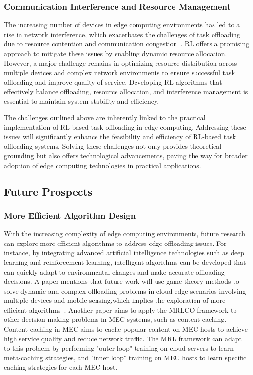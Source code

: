 \documentclass[journal]{IEEEtran}
\begin{document}
\subsubsection{Communication Interference and Resource Management}
The increasing number of devices in edge computing environments has led to a rise in network interference, which exacerbates the challenges of task offloading due to resource contention and communication congestion~\cite{zhou08}. RL offers a promising approach to mitigate these issues by enabling dynamic resource allocation. However, a major challenge remains in optimizing resource distribution across multiple devices and complex network environments to ensure successful task offloading and improve quality of service. Developing RL algorithms that effectively balance offloading, resource allocation, and interference management is essential to maintain system stability and efficiency.

The challenges outlined above are inherently linked to the practical implementation of RL-based task offloading in edge computing. Addressing these issues will significantly enhance the feasibility and efficiency of RL-based task offloading systems. Solving these challenges not only provides theoretical grounding but also offers technological advancements, paving the way for broader adoption of edge computing technologies in practical applications.

\subsection{Future Prospects}

\subsubsection{More Efficient Algorithm Design}
With the increasing complexity of edge computing environments, future research can explore more efficient algorithms to address edge offloading issues. For instance, by integrating advanced artificial intelligence technologies such as deep learning and reinforcement learning, intelligent algorithms can be developed that can quickly adapt to environmental changes and make accurate offloading decisions. A paper mentions that future work will use game theory methods to solve dynamic and complex offloading problems in cloud-edge scenarios involving multiple devices and mobile sensing,which implies the exploration of more efficient algorithms~\cite{zhou01}. Another paper aims to apply the MRLCO framework to other decision-making problems in MEC systems, such as content caching. Content caching in MEC aims to cache popular content on MEC hosts to achieve high service quality and reduce network traffic. The MRL framework can adapt to this problem by performing "outer loop" training on cloud servers to learn meta-caching strategies, and "inner loop" training on MEC hosts to learn specific caching strategies for each MEC host.~\cite{xyj01}
\end{document}
